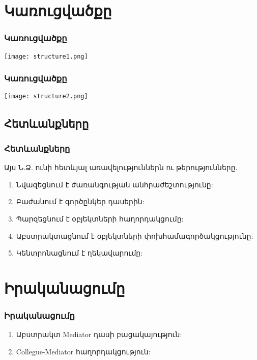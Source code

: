 \documentclass{beamer}
\begin{document}
\section{Կառուցվածքը}
\begin{frame}\frametitle{Կառուցվածքը}
\begin{center}
    \texttt{[image: structure1.png]}
\end{center}
\end{frame}
\begin{frame}\frametitle{Կառուցվածքը}
\begin{center}
    \texttt{[image: structure2.png]}
\end{center}
\end{frame}

\subsection{Հետևանքները}
\begin{frame}\frametitle{Հետևանքները}
Այս Ն.Ձ. ունի հետևյալ առավելություններն ու թերությունները.
\vfill
\begin{enumerate}
    \item Նվազեցնում է ժառանգության անհրաժեշտությունը: \vfill
    \item Բաժանում է գործընկեր դասերին: \vfill
    \item Պարզեցնում է օբյեկտների հաղորդակցումը: \vfill
    \item Աբստրակտացնում է օբյեկտների փոխհամագործակցությունը: \vfill
    \item Կենտրոնացնում է ղեկավարումը:
\end{enumerate}
\end{frame}

\section{Իրականացումը}
\begin{frame}\frametitle{Իրականացումը}
\begin{enumerate}
    \item Աբստրակտ Mediator դասի բացակայություն: \vfill
    \item Collegue-Mediator հաղորդակցություն:
\end{enumerate}
\end{frame}
\end{document}
